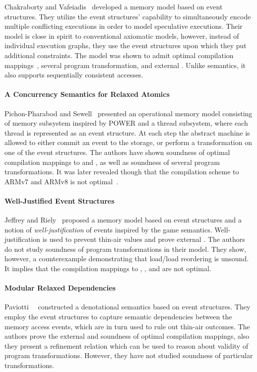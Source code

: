 Chakraborty and Vafeiadis~\cite{Chakraborty-Vafeiadis:CGO17, Chakraborty-Vafeiadis:POPL19}
developed a memory model based on event structures. 
They utilize the event structures' capability to simultaneously encode 
multiple conflicting executions in order to model speculative executions.
Their model is close in spirit to conventional axiomatic models, 
however, instead of individual execution graphs, they use 
the event structures upon which they put additional constraints. 
The model was shown to admit optimal compilation mappings~\cite{Moiseenko-al:ECOOP20},
several program transformation, and external \DRF.
Unlike \Promising semantics, it also supports 
sequentially consistent accesses.

\paragraph{A Concurrency Semantics for Relaxed Atomics}

Pichon-Pharabod and Sewell~\cite{PichonPharabod-Sewell:POPL16} 
presented an operational memory model consisting of 
memory subsystem inspired by POWER and a thread subsystem, 
where each thread is represented as an event structure. 
At each step the abstract machine is allowed to either 
commit an event to the storage, or perform a transformation 
on one of the event structures. 
The authors have shown soundness of 
optimal compilation mappings to \Intel and \POWER, 
as well as soundness of several program transformations.
It was later revealed though that the compilation scheme
to ARMv7 and ARMv8 is not optimal~\cite{PichonPharabod:PhD18}.

\paragraph{Well-Justified Event Structures}

Jeffrey and Riely~\cite{Jeffrey-Riely:LICS16} proposed 
a memory model based on event structures and a notion of 
\emph{well-justification} of events inspired by the game semantics. 
Well-justification is used to prevent thin-air values 
and prove external \DRF. The authors do not study 
soundness of program transformations in their model. 
They show, however, a counterexample demonstrating that 
load/load reordering is unsound. It implies that 
the compilation mappings to , , and \POWER are not optimal.   

\paragraph{Modular Relaxed Dependencies}

Paviotti~\etal~\cite{Paviotti-al:ESOP20} constructed a 
denotational semantics based on event structures. 
They employ the event structures to capture 
semantic dependencies between the memory access events, 
which are in turn used to rule out thin-air outcomes.
The authors prove the external \DRF and 
soundness of optimal compilation mappings,
also they present a refinement relation which 
can be used to reason about validity of program transformations. 
However, they have not studied soundness of particular transformations. 
